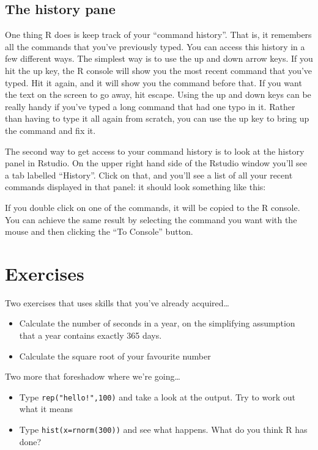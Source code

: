\documentclass[]{book}
\providecommand{\tightlist}{%
  \setlength{\itemsep}{0pt}\setlength{\parskip}{0pt}}
\begin{document}
\hypertarget{the-history-pane}{%
\subsection{The history pane}\label{the-history-pane}}

One thing R does is keep track of your ``command history''. That is, it remembers all the commands that you've previously typed. You can access this history in a few different ways. The simplest way is to use the up and down arrow keys. If you hit the up key, the R console will show you the most recent command that you've typed. Hit it again, and it will show you the command before that. If you want the text on the screen to go away, hit escape. Using the up and down keys can be really handy if you've typed a long command that had one typo in it. Rather than having to type it all again from scratch, you can use the up key to bring up the command and fix it.

The second way to get access to your command history is to look at the history panel in Rstudio. On the upper right hand side of the Rstudio window you'll see a tab labelled ``History''. Click on that, and you'll see a list of all your recent commands displayed in that panel: it should look something like this:

If you double click on one of the commands, it will be copied to the R console. You can achieve the same result by selecting the command you want with the mouse and then clicking the ``To Console'' button.

\hypertarget{exercises}{%
\section{Exercises}\label{exercises}}

Two exercises that uses skills that you've already acquired\ldots{}

\begin{itemize}
\tightlist
\item
  Calculate the number of seconds in a year, on the simplifying assumption that a year contains exactly 365 days.
\item
  Calculate the square root of your favourite number
\end{itemize}

Two more that foreshadow where we're going\ldots{}

\begin{itemize}
\tightlist
\item
  Type \texttt{rep("hello!",100)} and take a look at the output. Try to work out what it means
\item
  Type \texttt{hist(x=rnorm(300))} and see what happens. What do you think R has done?
\end{itemize}
\end{document}
